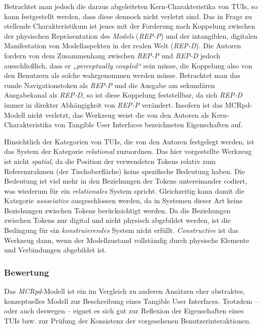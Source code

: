 Betrachtet man jedoch die daraus abgeleiteten Kern-Charakteristika von \glspl{TUI}, so kann festgestellt werden, dass diese dennoch nicht verletzt sind. Das in Frage zu stellende Charakteristikum ist jenes mit der Forderung nach Koppelung zwischen der physischen Repräsentation des \emph{Models} (\emph{REP-P}) und der intangiblen, digitalen Manifestation von Modellaspekten in der realen Welt (\emph{REP-D}). Die Autoren fordern von dem Zusammenhang zwischen \emph{REP-P} und \emph{REP-D} jedoch ausschließlich, dass er \emph{„perceptually coupled“} sein müsse, die Koppelung also von den Benutzern als solche wahrgenommen werden müsse. Betrachtet man das runde Navigationstoken als \emph{REP-P} und die Ausgabe am sekundären Ausgabekanal als \emph{REP-D}, so ist diese Koppelung feststellbar, da sich \emph{REP-D} immer in direkter Abhängigkeit von \emph{REP-P} verändert. Insofern ist das \gls{MCRpd}-Modell nicht verletzt, das Werkzeug weist die von den Autoren als Kern-Charakteristika von Tangible User Interfaces bezeichneten Eigenschaften auf.

Hinsichtlich der Kategorien von \glspl{TUI}, die von den Autoren festgelegt werden, ist das System der Kategorie \emph{relational} zuzuordnen. Das hier vorgestellte Werkzeug ist nicht \emph{spatial}, da die Position der verwendeten Tokens relativ zum Referenzrahmen (der Tischoberfläche) keine spezifische Bedeutung haben. Die Bedeutung ist viel mehr in den Beziehungen der Tokens untereinander codiert, was wiederum für ein \emph{relationales} System spricht. Gleichzeitig kann damit die Kategorie \emph{associative} ausgeschlossen werden, da in Systemen dieser Art keine Beziehungen zwischen Tokens berücksichtigt werden. Da die Beziehungen zwischen Tokens nur digital und nicht physisch abgebildet werden, ist die Bedingung für ein \emph{konstruierendes} System nicht erfüllt. \emph{Constructive} ist das Werkzeug dann, wenn der Modellzustand vollständig durch physische Elemente und Verbindungen abgebildet ist.

\subsubsection{Bewertung}

Das \emph{MCRpd}-Modell ist ein im Vergleich zu anderen Ansätzen eher abstraktes, konzeptuelles Modell zur Beschreibung eines Tangible User Interfaces. Trotzdem -- oder auch deswegen -- eignet es sich gut zur Reflexion der Eigenschaften eines \glspl{TUI} bzw. zur Prüfung der Konsistenz der vorgesehenen Benutzerinteraktionen.

